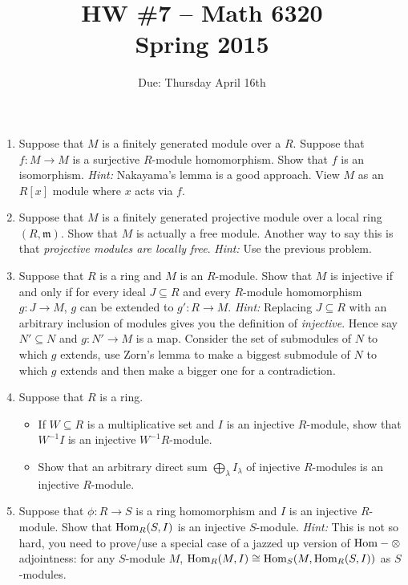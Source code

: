 \documentclass[11pt]{amsart}
\theoremstyle{theorem}
\renewcommand{\to}[1][]{\xrightarrow{\ #1\ }}
\newcommand{\Hom}{\textnormal{Hom}}
\begin{document}
\title{HW \#7 -- Math 6320\\Spring 2015}
\author{Due: Thursday April 16th}
\maketitle

\begin{enumerate}
\item Suppose that $M$ is a finitely generated module over a $R$.  Suppose that $f : M \to M$ is a surjective $R$-module homomorphism.  Show that $f$ is an isomorphism.
    \vskip 3pt
    \emph{Hint: } Nakayama's lemma is a good approach.  View $M$ as an $R[x]$ module where $x$ acts via $f$.
    \vskip 6pt
\item Suppose that $M$ is a finitely generated projective module over a local ring $(R, \mathfrak{m})$.  Show that $M$ is actually a free module.  Another way to say this is that \emph{projective modules are locally free}.  
    \vskip 3pt
    \emph{Hint: } Use the previous problem.
    \vskip 6pt
\item Suppose that $R$ is a ring and $M$ is an $R$-module.  Show that $M$ is injective if and only if for every ideal $J \subseteq R$ and every $R$-module homomorphism $g : J \to M$, $g$ can be extended to $g' : R \to M$.  
    \vskip 3pt
    \emph{Hint: } Replacing $J \subseteq R$ with an arbitrary inclusion of modules gives you the definition of \emph{injective}.  Hence say $N' \subseteq N$ and $g : N' \to M$ is a map.  Consider the set of submodules of $N$ to which $g$ extends, use Zorn's lemma to make a biggest submodule of $N$ to which $g$ extends and then make a bigger one for a contradiction.
    \vskip 6pt
\item Suppose that $R$ is a ring.
\begin{itemize}
\item[(a)]  If $W\subseteq R$ is a multiplicative set and $I$ is an injective $R$-module, show that $W^{-1} I$ is an injective $W^{-1} R$-module.
\item[(b)]  Show that an arbitrary direct sum $\bigoplus_\lambda I_{\lambda}$ of injective $R$-modules is an injective $R$-module.
\end{itemize}
\vskip 6pt
\item Suppose that $\phi : R \to S$ is a ring homomorphism and $I$ is an injective $R$-module.  Show that $\Hom_R(S, I)$ is an injective $S$-module.
    \vskip 3pt
    \emph{Hint: } This is not so hard, you need to prove/use a special case of a jazzed up version of $\Hom-\otimes$ adjointness:  for any $S$-module $M$, $\Hom_R(M, I) \cong \Hom_S(M, \Hom_R(S, I))$ as $S$-modules.  

\end{enumerate}
\end{document}

